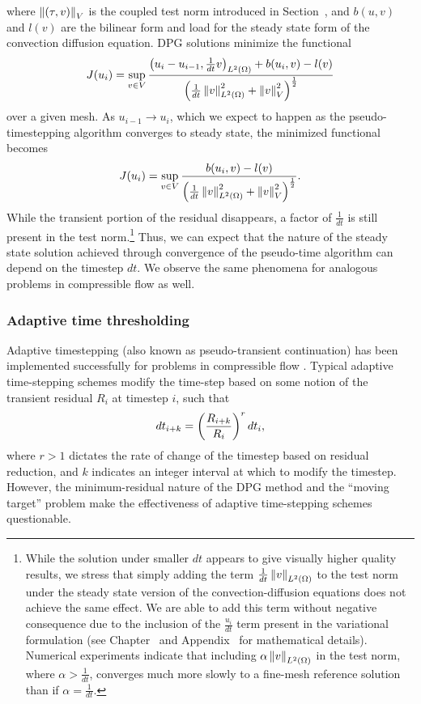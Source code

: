 where $\nor{\LRp{\tau,v}}_{V}$ is the coupled test norm introduced in Section~, and $b(u,v)$ and $l(v)$ are the bilinear form and load for the steady state form of the convection diffusion equation.  DPG solutions minimize the functional 
\[
J(u_i) = \sup_{v\in V} \frac{\LRp{u_{i}-u_{i-1}, \frac{1}{dt}v}_{\L} + b(u_i,v) - l(v)}{\LRp{\frac{1}{dt}\nor{v}_{\L}^2 + \nor{v}_V^2}^{\frac{1}{2}}}
\]
over a given mesh.  As $u_{i-1}\rightarrow u_{i}$, which we expect to happen as the pseudo-timestepping algorithm converges to steady state, the minimized functional becomes
\[
J(u_i) = \sup_{v\in V} \frac{b(u_i,v) - l(v)}{\LRp{\frac{1}{dt}\nor{v}_{\L}^2 + \nor{v}_V^2}^{\frac{1}{2}}}.
\]
While the transient portion of the residual disappears, a factor of $\frac{1}{dt}$ is still present in the test norm.\footnote{While the solution under smaller $dt$ appears to give visually higher quality results, we stress that simply adding the term $\frac{1}{dt}\nor{v}_{\L}$ to the test norm under the steady state version of the convection-diffusion equations does not achieve the same effect.  We are able to add this term without negative consequence due to the inclusion of the $\frac{u_i}{dt}$ term present in the variational formulation (see Chapter~ and Appendix~ for mathematical details).  Numerical experiments indicate that including $\alpha\nor{v}_{\L}$ in the test norm, where $\alpha > \frac{1}{dt}$, converges much more slowly to a fine-mesh reference solution than if $\alpha = \frac{1}{dt}$.}  Thus, we can expect that the nature of the steady state solution achieved through convergence of the pseudo-time algorithm can depend on the timestep $dt$.  We observe the same phenomena for analogous problems in compressible flow as well.  

\subsubsection{Adaptive time thresholding}

Adaptive timestepping (also known as pseudo-transient continuation) has been implemented successfully for problems in compressible flow \cite{BenKirk}. Typical adaptive time-stepping schemes modify the time-step based on some notion of the transient residual $R_i$ at timestep $i$, such that
\[
dt_{i+k} = \LRp{\frac{R_{i+k}}{R_i}}^r dt_i,
\]
where $r > 1$ dictates the rate of change of the timestep based on residual reduction, and $k$ indicates an integer interval at which to modify the timestep.  However, the minimum-residual nature of the DPG method and the ``moving target'' problem make the effectiveness of adaptive time-stepping schemes questionable.  

